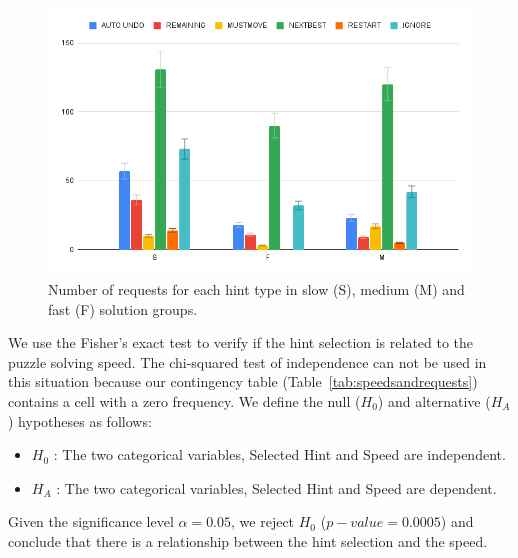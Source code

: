 \begin{figure}[tpb]
  \centering
\includegraphics[width=0.8\columnwidth]{img/speedreq.png}
  \caption{Number of requests for each hint type in slow (S), medium (M) and fast (F) solution groups.}
  \label{fig:speedrequest}
\end{figure}

We use the Fisher's exact test to verify if the hint selection is related to the puzzle solving speed.
The chi-squared test of independence can not be used in this situation because our contingency table (Table~\ref{tab:speedsandrequests}) contains a cell with a zero frequency.
We define the null ($H_0$) and alternative ($H_A$) hypotheses as follows:
\begin{itemize}
\item $H_0$ : The two categorical variables, Selected Hint and Speed are independent.
\item $H_A$ : The two categorical variables, Selected Hint and Speed are dependent. 
\end{itemize} 
Given the significance level $\alpha=0.05$, we reject $H_0$ ($p-value = 0.0005$) and conclude that there is a relationship between the hint selection and the speed.

